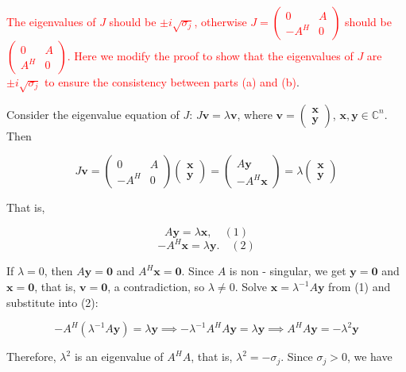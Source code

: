 \documentclass{article}
\begin{document}
\textcolor{red}{The eigenvalues of $ J $ should be $\pm i\sqrt{\sigma_j}$, otherwise $J=\begin{pmatrix}0&A\\-A^H&0\end{pmatrix}$ should be $\begin{pmatrix}0&A\\A^H&0\end{pmatrix}$. Here we modify the proof to show that the eigenvalues of $J$ are $\pm i\sqrt{\sigma_j}$ to ensure the consistency between parts (a) and (b)}.
	
Consider the eigenvalue equation of $ J $: $ J\mathbf{v} = \lambda\mathbf{v} $, where $ \mathbf{v}=\begin{pmatrix}\mathbf{x}\\\mathbf{y}\end{pmatrix} $, $ \mathbf{x}, \mathbf{y}\in\mathbb{C}^n$. Then

$$
J\mathbf{v}=\begin{pmatrix}0&A\\-A^H&0\end{pmatrix}\begin{pmatrix}\mathbf{x}\\\mathbf{y}\end{pmatrix}=\begin{pmatrix}A\mathbf{y}\\-A^H\mathbf{x}\end{pmatrix}=\lambda\begin{pmatrix}\mathbf{x}\\\mathbf{y}\end{pmatrix}
$$

That is,

$$
A\mathbf{y}=\lambda\mathbf{x},\quad(1)
$$
$$
-A^H\mathbf{x}=\lambda\mathbf{y}.\quad(2)
$$

If $ \lambda = 0 $, then $ A\mathbf{y}=\mathbf{0} $ and $ A^H\mathbf{x}=\mathbf{0} $. Since $ A $ is non - singular, we get $ \mathbf{y}=\mathbf{0} $ and $ \mathbf{x}=\mathbf{0} $, that is, $ \mathbf{v}=\mathbf{0} $, a contradiction, so $ \lambda\neq 0 $. Solve $ \mathbf{x}=\lambda^{- 1}A\mathbf{y} $ from (1) and substitute into (2):

$$
-A^H(\lambda^{- 1}A\mathbf{y})=\lambda\mathbf{y}\implies -\lambda^{- 1}A^H A\mathbf{y}=\lambda\mathbf{y}\implies A^H A\mathbf{y}=-\lambda^2\mathbf{y}
$$

Therefore, $ \lambda^2 $ is an eigenvalue of $ A^H A $, that is, $ \lambda^2=- \sigma_j $. Since $ \sigma_j>0 $, we have
\end{document}
